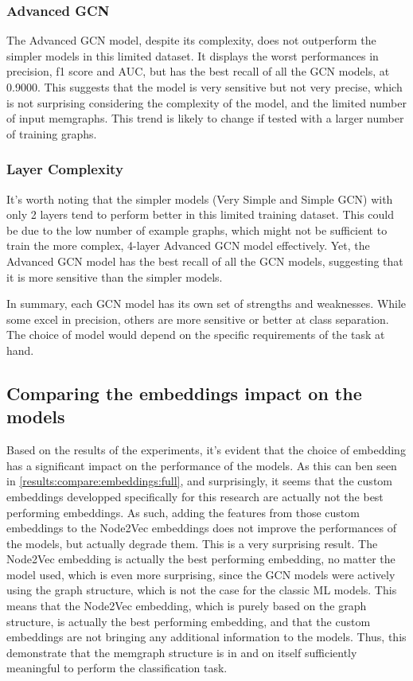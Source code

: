 \subsubsection{Advanced GCN}
The Advanced GCN model, despite its complexity, does not outperform the simpler models in this limited dataset. It displays the worst performances in precision, f1 score and AUC, but has the best recall of all the GCN models, at 0.9000. This suggests that the model is very sensitive but not very precise, which is not surprising considering the complexity of the model, and the limited number of input memgraphs. This trend is likely to change if tested with a larger number of training graphs.

\subsubsection{Layer Complexity}
It's worth noting that the simpler models (Very Simple and Simple GCN) with only 2 layers tend to perform better in this limited training dataset. This could be due to the low number of example graphs, which might not be sufficient to train the more complex, 4-layer Advanced GCN model effectively. Yet, the Advanced GCN model has the best recall of all the GCN models, suggesting that it is more sensitive than the simpler models.

In summary, each GCN model has its own set of strengths and weaknesses. While some excel in precision, others are more sensitive or better at class separation. The choice of model would depend on the specific requirements of the task at hand.

\subsection{Comparing the embeddings impact on the models}
Based on the results of the experiments, it's evident that the choice of embedding has a significant impact on the performance of the models. As this can ben seen in \ref{results:compare:embeddings:full}, and surprisingly, it seems that the custom embeddings developped specifically for this research are actually not the best performing embeddings. As such, adding the features from those custom embeddings to the Node2Vec embeddings does not improve the performances of the models, but actually degrade them. This is a very surprising result. The Node2Vec embedding is actually the best performing embedding, no matter the model used, which is even more surprising, since the GCN models were actively using the graph structure, which is not the case for the classic ML models. This means that the Node2Vec embedding, which is purely based on the graph structure, is actually the best performing embedding, and that the custom embeddings are not bringing any additional information to the models. Thus, this demonstrate that the memgraph structure is in and on itself sufficiently meaningful to perform the classification task. 

